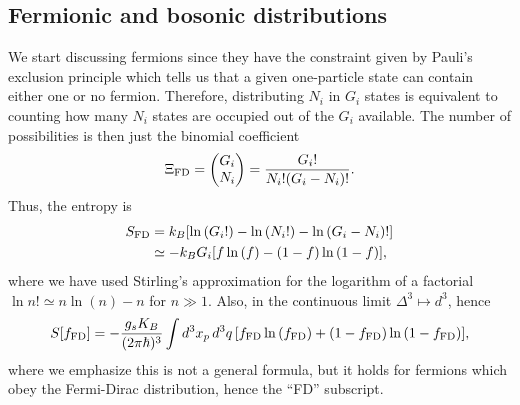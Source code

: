 \subsection{Fermionic and bosonic distributions}
We start discussing fermions since they have the constraint given by Pauli's exclusion principle which tells us that a given one-particle state can contain either one or no fermion. Therefore, distributing $N_i$ in $G_i$ states is equivalent to counting how many $N_i$ states are occupied out of the $G_i$ available. The number of possibilities is then just the binomial coefficient
\begin{equation}
    \Xi_{\mathrm{FD}} = 
    \begin{pmatrix}
        G_i \\
        N_i    
    \end{pmatrix} = \frac{G_i!}{N_i!(G_i - N_i)!}.
\end{equation}
Thus, the entropy is 
\begin{equation}
    \begin{split}
        S_{\mathrm{FD}} &= k_B[\ln{(G_i!)} - \ln{(N_i!)} - \ln{(G_i - N_i)!}] \\
        &\simeq -k_BG_i[f\ln{(f)} - (1 - f)\ln{(1 - f)}],
    \end{split}
\end{equation}
where we have used Stirling's approximation for the logarithm of a factorial $\ln{n!} \simeq n\ln{(n)} - n$ for $n \gg 1$. Also, in the continuous limit $\Delta^3 \mapsto d^3$, hence 
\begin{equation}
    S[f_{\mathrm{FD}}] = -\frac{g_sK_B}{(2\pi\hbar)^3}\int d^3x_p\,d^3q\,[f_{\mathrm{FD}}\ln{(f_{\mathrm{FD}})} + (1 - f_{\mathrm{FD}})\ln{(1 - f_{\mathrm{FD}})}],
\end{equation}
where we emphasize this is not a general formula, but it holds for fermions which obey the Fermi-Dirac distribution, hence the ``FD'' subscript.

